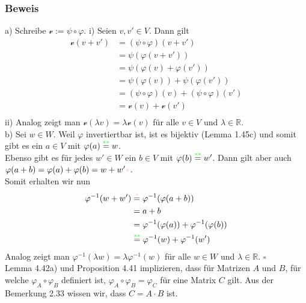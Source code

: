 \documentclass{article}
\begin{document}
\subsubsection*{Beweis}
a) Schreibe $\mathcal{v} := \psi \circ \varphi$. 
i) Seien $v,v' \in V$. Dann gilt \\
\begin{align*}
    \mathcal{v}(v + v') &= (\psi \circ \varphi)(v + v') \\
    &= \psi(\varphi(v + v')) \\
    &= \psi(\varphi(v) + \varphi(v')) \\
    &= \psi(\varphi(v)) + \psi(\varphi(v')) \\
    &= (\psi \circ \varphi)(v) + (\psi \circ \varphi)(v') \\
    &= \mathcal{v}(v) + \mathcal{v}(v') \\
\end{align*}
ii) Analog zeigt man $\mathcal{v}(\lambda v) = \lambda \mathcal{v}(v)$ für alle $v \in V$ und $\lambda \in \mathbb{R}$. \\
b) Sei $w \in W$. Weil $\varphi$ invertiertbar ist, ist es bijektiv (Lemma 1.45c) und somit gibt es ein $a \in V$ mit $\varphi(a) \overset{\textcolor{green}{**}}{=} w$. \\
Ebenso gibt es für jedes $w' \in W$ ein $b \in V$ mit $\varphi(b) \overset{\textcolor{green}{**}}{=} w'$. 
Dann gilt aber auch $\varphi(a + b) = \varphi(a) + \varphi(b) = w + w'\textcolor{pink}{*}$. \\
Somit erhalten wir nun \\
\begin{align*}
    \varphi^{-1}(w + w') &\overset{\textcolor{pink}{*}}{=} \varphi^{-1}(\varphi(a + b)) \\
    &= a + b \\
    &= \varphi^{-1}(\varphi(a)) + \varphi^{-1}(\varphi(b)) \\
    &\overset{\textcolor{green}{**}}{=} \varphi^{-1}(w) + \varphi^{-1}(w') \\
\end{align*}
Analog zeigt man $\varphi^{-1}(\lambda w) = \lambda \varphi^{-1}(w)$ 
für alle $w \in W$ und $\lambda \in \mathbb{R}$. $\square$ \\
Lemma 4.42a) und Proposition 4.41 implizieren, dass für Matrizen $A$ und $B$, für welche $\varphi_A \circ \varphi_B$ definiert ist, $\varphi_A \circ \varphi_B = \varphi_{C}$ für eine Matrix $C$ gilt. 
Aus der Bemerkung 2.33 wissen wir, dass $C = A \cdot B$ ist. \\
\\
\end{document}
